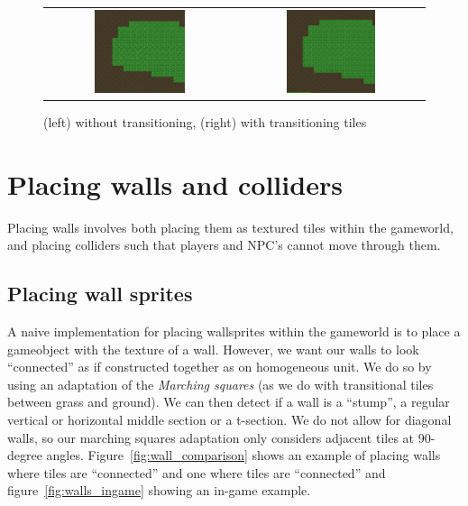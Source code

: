 \begin{figure}[H]
    \centering
    \begin{tabular}{cc}
        \includegraphics[width=0.5\textwidth]{figures/generating_levels/no_transition.png}
        &
        \includegraphics[width=0.5\textwidth]{figures/generating_levels/with_transition.png}
    \end{tabular}
    \caption{(left) without transitioning, (right) with transitioning tiles}\label{fig:transition_comparison}
\end{figure}

\section{Placing walls and colliders}
Placing walls involves both placing them as textured tiles within the
gameworld, and placing colliders such that players and NPC's cannot move
through them.

\subsection{Placing wall sprites}
A naive implementation for placing wallsprites within the gameworld is to place
a gameobject with the texture of a wall. However, we want our walls to look
``connected'' as if constructed together as on homogeneous unit. We do so by
using an adaptation of the \textit{Marching squares} (as we do with
transitional tiles between grass and ground). We can then detect if a wall is a
``stump'', a regular vertical or horizontal middle section or a t-section. We
do not allow for diagonal walls, so our marching squares adaptation only
considers adjacent tiles at 90-degree angles. Figure~\ref{fig:wall_comparison}
shows an example of placing walls where tiles are ``connected'' and one where
tiles are ``connected'' and figure~\ref{fig:walls_ingame} showing an in-game
example.

